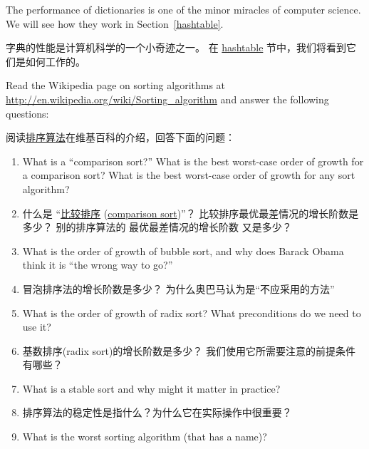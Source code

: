 The performance of dictionaries is one of the minor miracles of
computer science.  We will see how they work in
Section~\ref{hashtable}.

字典的性能是计算机科学的一个小奇迹之一。
在 \hyperref[hashtable]{hashtable} 节中，我们将看到它们是如何工作的。

\begin{exercise}

Read the Wikipedia page on sorting algorithms at
\url{http://en.wikipedia.org/wiki/Sorting_algorithm} and answer
the following questions:

阅读\href{http://en.wikipedia.org/wiki/Sorting_algorithm}{排序算法}在维基百科的介绍，回答下面的问题：

\begin{enumerate}

\item What is a ``comparison sort?'' What is the best worst-case order
  of growth for a comparison sort?  What is the best worst-case order
  of growth for any sort algorithm?

\item 什么是 ``\href{https://zh.wikipedia.org/wiki/%E6%AF%94%E8%BE%83%E6%8E%92%E5%BA%8F}{比较排序} (\href{https://en.wikipedia.org/wiki/Comparison_sort}{comparison sort})''？  比较排序最优最差情况的增长阶数是多少？  别的排序算法的 最优最差情况的增长阶数 又是多少？

\item What is the order of growth of bubble sort, and why does Barack
  Obama think it is ``the wrong way to go?''

\item 冒泡排序法的增长阶数是多少？ 为什么奥巴马认为是``不应采用的方法''

\item What is the order of growth of radix sort?  What preconditions
  do we need to use it?

\item 基数排序(radix sort)的增长阶数是多少？ 我们使用它所需要注意的前提条件有哪些？

\item What is a stable sort and why might it matter in practice?

\item 排序算法的稳定性是指什么？为什么它在实际操作中很重要？

\item What is the worst sorting algorithm (that has a name)?


\end{enumerate}
\end{exercise}

